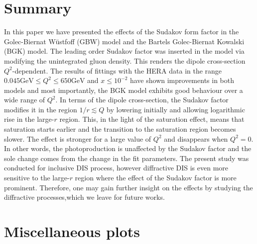 \documentclass[11pt]{article}
\begin{document}
\section{Summary}
In this paper we have presented the effects of the Sudakov form factor in the Golec-Biernat W\"ustfoff (GBW) model and the Bartels Golec-Biernat Kowalski (BGK) model. 
The leading order Sudakov factor was inserted in the model via modifying the unintegrated gluon density. This renders the dipole cross-section $Q^2$-dependent.
The results of fittings with the HERA data in the range $0.045\mathrm{GeV} \leq Q^2 \leq 650\mathrm{GeV}$ and $x\leq 10^{-2}$ have shown improvements in both models and most importantly, the BGK model exhibits good behaviour over a wide range of $Q^2$.  In terms of the dipole cross-section, the Sudakov factor modifies it in the region $1/r\lesssim Q$ by lowering initially and allowing logarithmic rise in the large-$r$ region.  This, in the light of the saturation effect, means that saturation starts earlier and the transition to the saturation region becomes slower. The effect is stronger for a large value of $Q^2$ and disappears when $Q^2=0$. In other words, the photoproduction is unaffected by the Sudakov factor and the sole change comes from the change in the fit parameters. The present study was conducted for inclusive DIS process, however diffractive DIS is even more sensitive to the large-$r$ region where the effect of the Sudakov factor is more prominent. Therefore, one may gain further insight on the effects by studying the diffractive processes,which we leave for future works.


\printbibliography
\appendix
\section{Miscellaneous plots}
\end{document}
